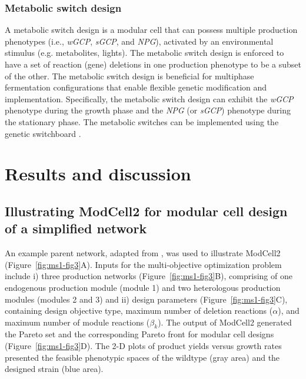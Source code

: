 \subsubsection{Metabolic switch design} A metabolic switch design is a
modular cell that can possess multiple production phenotypes (i.e.,
\emph{wGCP}, \emph{sGCP}, and \emph{NPG}), activated by an environmental
stimulus (e.g. metabolites, lights). The metabolic switch design is
enforced to have a set of reaction (gene) deletions in one production
phenotype to be a subset of the other.
The metabolic switch design is beneficial for multiphase fermentation
configurations that enable flexible genetic modification and
implementation. Specifically, the metabolic switch design can exhibit
the \emph{wGCP} phenotype during the growth phase and the \emph{NPG} (or
\emph{sGCP}) phenotype during the stationary phase. The metabolic
switches can be implemented using the genetic switchboard
\citep{callura2012}.

\section{Results and discussion}

\subsection{Illustrating ModCell2 for modular cell design of a simplified network}

An example parent network, adapted from \citep{trinh2015}, was used to illustrate ModCell2 (Figure~\ref{fig:ms1-fig3}A).
Inputs for the multi-objective optimization problem include i) three production networks (Figure~\ref{fig:ms1-fig3}B), comprising of one endogenous production module (module 1) and two heterologous production modules (modules 2 and 3) and ii) design parameters (Figure~\ref{fig:ms1-fig3}C), containing design objective type, maximum number of deletion reactions (\(\alpha\)), and maximum number of module reactions (\(\beta_{k}\)).
The output of ModCell2 generated the Pareto set and the corresponding Pareto front for modular cell designs (Figure~\ref{fig:ms1-fig3}D).
The 2-D plots of product yields versus growth rates presented the feasible phenotypic spaces of the wildtype (gray area) and the designed strain (blue area).

